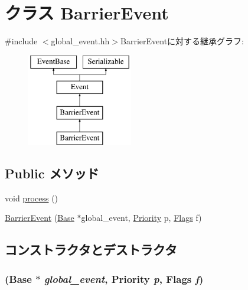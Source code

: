 \hypertarget{classGlobalEvent_1_1BarrierEvent}{
\section{クラス BarrierEvent}
\label{classGlobalEvent_1_1BarrierEvent}
}


{\ttfamily \#include $<$global\_\-event.hh$>$}BarrierEventに対する継承グラフ:\begin{figure}[H]
\begin{center}
\leavevmode
\includegraphics[height=4cm]{classGlobalEvent_1_1BarrierEvent}
\end{center}
\end{figure}
\subsection*{Public メソッド}
\begin{DoxyCompactItemize}
\item 
void \hyperlink{classGlobalEvent_1_1BarrierEvent_a2e9c5136d19b1a95fc427e0852deab5c}{process} ()
\item 
\hyperlink{classGlobalEvent_1_1BarrierEvent_a6ebac12bc5ce36b50ab0dcb9bbb73235}{BarrierEvent} (\hyperlink{classBaseGlobalEventTemplate}{Base} $\ast$global\_\-event, \hyperlink{classEventBase_a6d92f7ee8144a5911ed46d85a89a4934}{Priority} p, \hyperlink{classFlags}{Flags} f)
\end{DoxyCompactItemize}


\subsection{コンストラクタとデストラクタ}
\hypertarget{classGlobalEvent_1_1BarrierEvent_a6ebac12bc5ce36b50ab0dcb9bbb73235}{
\subsubsection[{BarrierEvent}]{ ({\bf Base} $\ast$ {\em global\_\-event}, \/  {\bf Priority} {\em p}, \/  {\bf Flags} {\em f})}}
\label{classGlobalEvent_1_1BarrierEvent_a6ebac12bc5ce36b50ab0dcb9bbb73235}



